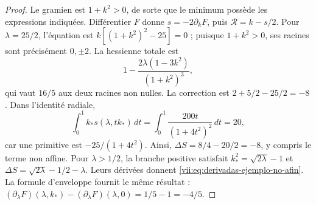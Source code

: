 \begin{proof}
Le gramien est \(1+k^2>0\), de sorte que le minimum possède les expressions indiquées. Différentier \(F\) donne \(s=-2\partial_kF\), puis \(\mathcal R=k-s/2\). Pour \(\lambda=25/2\), l'équation est \(k[(1+k^2)^2-25]=0\) ; puisque \(1+k^2>0\), ses racines sont précisément \(0,\pm2\). La hessienne totale est
\[
 1-\frac{2\lambda(1-3k^2)}{(1+k^2)^3},
\]
qui vaut \(16/5\) aux deux racines non nulles. La correction est
\(2+5/2-25/2=-8\). Dans l'identité radiale,
\[
 \int_0^1 k_*s(\lambda,tk_*)\,dt
    =\int_0^1\frac{200t}{(1+4t^2)^2}\,dt=20,
\]
car une primitive est \(-25/(1+4t^2)\).
Ainsi, \(\Delta S=8/4-20/2=-8\), y compris le terme non affine.
Pour \(\lambda>1/2\), la branche positive satisfait
\(k_*^2=\sqrt{2\lambda}-1\) et
\(\Delta S=\sqrt{2\lambda}-1/2-\lambda\).
Leurs dérivées donnent \eqref{vii:eq:derivadas-ejemplo-no-afin}.
La formule d'enveloppe fournit le même résultat :
\((\partial_\lambda F)(\lambda,k_*)
 -(\partial_\lambda F)(\lambda,0)=1/5-1=-4/5\).
\end{proof}
